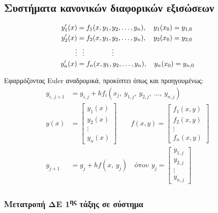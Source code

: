 \documentclass[11pt,a4paper,notitlepage,fleqn]{article}
\begin{document}
\subsection{Συστήματα κανονικών διαφορικών εξισώσεων}
\begin{align*}
	y_1'(x)  &= f_1(x,y_1,y_2,\dots,y_n),\quad y_1(x_0) = y_{1,0} \\
	y_2'(x)  &= f_2(x,y_1,y_2,\dots,y_n),\quad y_2(x_0) = y_{2,0} \\
	\vdots &\hphantom{= } \vdots \qquad \qquad \vdots \\
	y_n'(x) &= f_n(x,y_1,y_2,\dots,y_n),\quad y_n(x_0)=y_{n,0}
\end{align*}

Εφαρμόζοντας Euler αναδρομικά, προκύπτει όπως και προηγουμένως:
\begin{align*}
	y_{i,\ j+1} &= y_{i,j}+hf_i(x_j,\ y_{1,j},\ y_{2,j},\ \dots,\ 
	y_{n,j}) \\
	y(x) &= \left[\begin{matrix}
	y_1(x) \\ y_2(x) \\ \vdots \\ y_n(x)
	\end{matrix}\right] \qquad
	f(x,y) = \left[\begin{matrix}
	f_1(x,y) \\ f_2(x,y) \\ \vdots \\ f_n(x,y)
	\end{matrix}\right] \\
	y_{j+1} &= y_j + hf(x,\ y_j)
	\quad \text{όπου } y_j = \left[\begin{matrix}
	y_{1,j} \\ y_{2,j} \\ \vdots \\ y_{n,j}
	\end{matrix}\right]
\end{align*}

\subsubsection{Μετατροπή ΔΕ 1\textsuperscript{ης} τάξης σε σύστημα}
\end{document}
